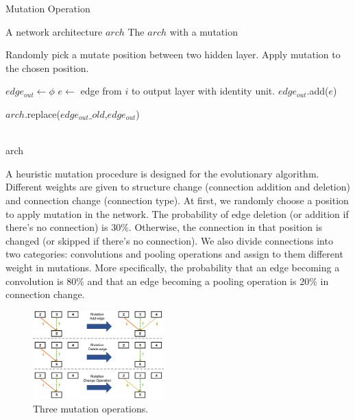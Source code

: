 \documentclass[conference]{IEEEtran}
\begin{document}
  

 \begin{algorithm}[H]  
    \caption{ Mutation Operation}
 

    \begin{algorithmic}[1]  
    \Require A network architecture $arch$
    \Ensure The $arch$ with a mutation
    
    
        \State Randomly pick a mutate position between two hidden layer.
        \State Apply mutation to the chosen position. 
    \EndWhile
    
    \State $edge_{out} \gets \phi$
      \State $e \gets$ edge from $i$ to output layer with identity unit.
      \State $edge_{out}$.add($e$)
    \EndFor

    \State $arch$.replace($edge_{out}\_old$,$edge_{out}$)

    \\
    \Return arch
    \end{algorithmic}  
    \label{mutation}
\end{algorithm}  

  A heuristic mutation procedure is designed for the evolutionary algorithm. Different weights are given to structure change (connection addition and deletion) and connection change (connection type). At first, we randomly choose a position to apply mutation in the network. The probability of edge deletion (or addition if there's no connection) is $30\%$. Otherwise, the connection in that position is changed (or skipped if there's no connection). We also divide connections into two categories: convolutions and pooling operations and assign to them different weight in mutations. More specifically, the probability that an edge becoming a convolution is $80\%$ and that an edge becoming a pooling operation is $20\%$ in connection change. 

\begin{figure}[H]
	\centering
	\includegraphics[width=0.45\textwidth]{figures/mutation.png}
	\caption{Three mutation operations.}\label{fig:digit}
	\label{mutation}
\end{figure}
\end{document}

